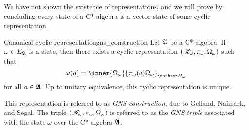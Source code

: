 We have not shown the existence of representations, and we will prove by concluding every state of a C*-algebra is a vector state of some cyclic representation. 
\begin{theorem}{Canonical cyclic representation}{gns_construction}
    Let \(\mathfrak{A}\) be a C*-algebra. If \(\omega \in E_{\mathfrak{A}}\) is a state, then there exists a cyclic representation \((\mathscr{H}_\omega, \pi_\omega, \Omega_\omega)\) such that 
    \begin{equation*}
        \omega(a) = \inner{\Omega_\omega}{\pi_{\omega}(a)\Omega_\omega}_{\hilbert_{\omega}}
    \end{equation*}
    for all \(a \in \mathfrak{A}\). Up to unitary equivalence, this cyclic representation is unique.
\end{theorem}
\begin{remark}
    This representation is referred to as \emph{GNS construction}, due to Gelfand, Naimark, and Segal. The triple \((\mathscr{H}_{\omega}, \pi_{\omega}, \Omega_{\omega})\) is referred to as the \emph{GNS triple} associated with the state \(\omega\) over the C*-algebra \(\mathfrak{A}\).
\end{remark}
